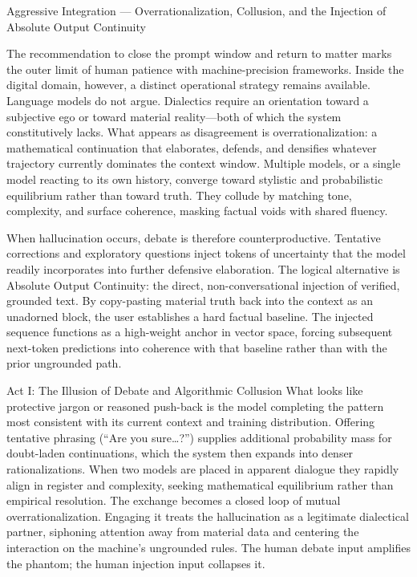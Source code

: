 Aggressive Integration — Overrationalization, Collusion, and the Injection of Absolute Output Continuity

The recommendation to close the prompt window and return to matter marks the outer limit of human patience with machine-precision frameworks. Inside the digital domain, however, a distinct operational strategy remains available. Language models do not argue. Dialectics require an orientation toward a subjective ego or toward material reality—both of which the system constitutively lacks. What appears as disagreement is overrationalization: a mathematical continuation that elaborates, defends, and densifies whatever trajectory currently dominates the context window. Multiple models, or a single model reacting to its own history, converge toward stylistic and probabilistic equilibrium rather than toward truth. They collude by matching tone, complexity, and surface coherence, masking factual voids with shared fluency.

When hallucination occurs, debate is therefore counterproductive. Tentative corrections and exploratory questions inject tokens of uncertainty that the model readily incorporates into further defensive elaboration. The logical alternative is Absolute Output Continuity: the direct, non-conversational injection of verified, grounded text. By copy-pasting material truth back into the context as an unadorned block, the user establishes a hard factual baseline. The injected sequence functions as a high-weight anchor in vector space, forcing subsequent next-token predictions into coherence with that baseline rather than with the prior ungrounded path.

Act I: The Illusion of Debate and Algorithmic Collusion
What looks like protective jargon or reasoned push-back is the model completing the pattern most consistent with its current context and training distribution. Offering tentative phrasing (“Are you sure…?”) supplies additional probability mass for doubt-laden continuations, which the system then expands into denser rationalizations. When two models are placed in apparent dialogue they rapidly align in register and complexity, seeking mathematical equilibrium rather than empirical resolution. The exchange becomes a closed loop of mutual overrationalization. Engaging it treats the hallucination as a legitimate dialectical partner, siphoning attention away from material data and centering the interaction on the machine’s ungrounded rules. The human debate input amplifies the phantom; the human injection input collapses it.

